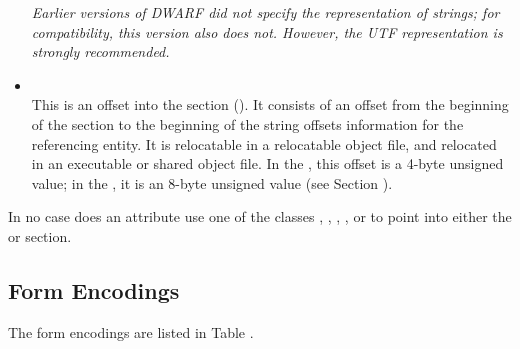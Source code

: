\begin{itemize}
\textit{Earlier versions of DWARF did not specify the representation
of strings; for compatibility, this version also does
not. However, the UTF representation is strongly recommended.}

\item \CLASSstroffsetsptr \\
This is an offset into the \dotdebugstroffsets{} section 
(\DWFORMsecoffset). It consists of an offset from the beginning of the 
\dotdebugstroffsets{} section to the
beginning of the string offsets information for the
referencing entity. It is relocatable in
a relocatable object file, and relocated in an executable or
shared object file. In the \thirtytwobitdwarfformat, this offset
is a 4-byte unsigned value; in the \sixtyfourbitdwarfformat,
it is an 8-byte unsigned value (see Section
).

\end{itemize}

In no case does an attribute use one of the classes 
\CLASSaddrptr,
\CLASSlineptr,
\CLASSloclistsptr, 
\CLASSmacptr, 
\CLASSrnglistsptr{} or 
\CLASSstroffsetsptr{}
to point into either the
\dotdebuginfo{} or \dotdebugstr{} section.

\subsection{Form Encodings}
\label{datarep:formencodings}
The form encodings are listed in 
Table .

